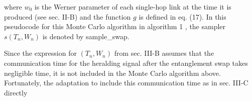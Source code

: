\documentclass[10pt]{article}
\begin{document}
where $w_{0}$ is the Werner parameter of each single-hop link at the time it is produced (see sec. II-B) and the function $g$ is defined in eq. (17). In this pseudocode for this Monte Carlo algorithm in algorithm 1 , the sampler $s\left(T_{n}, W_{n}\right)$ is denoted by sample\_swap.

Since the expression for $\left(T_{n}, W_{n}\right)$ from sec. III-B assumes that the communication time for the heralding signal after the entanglement swap takes negligible time, it is not included in the Monte Carlo algorithm above. Fortunately, the adaptation to include this communication time as in sec. III-C directly
\end{document}
